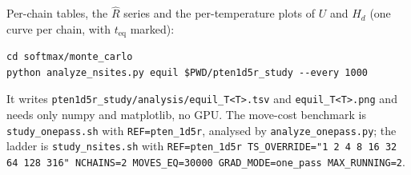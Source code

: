 \documentclass[11pt,a4paper]{article}
\newcommand{\Hd}{H_d}
\newcommand{\file}[1]{\texttt{#1}}
\begin{document}
Per-chain tables, the $\hat{R}$ series and the per-temperature plots of $U$ and
$\Hd$ (one curve per chain, with $t_{\mathrm{eq}}$ marked):
\begin{verbatim}
cd softmax/monte_carlo
python analyze_nsites.py equil $PWD/pten1d5r_study --every 1000
\end{verbatim}
It writes \file{pten1d5r\_study/analysis/equil\_T<T>.tsv} and
\file{equil\_T<T>.png} and needs only numpy and matplotlib, no GPU. The
move-cost benchmark is \file{study\_onepass.sh} with
\texttt{REF=pten\_1d5r}, analysed by \file{analyze\_onepass.py}; the ladder is
\file{study\_nsites.sh} with \texttt{REF=pten\_1d5r
TS\_OVERRIDE="1 2 4 8 16 32 64 128 316" NCHAINS=2 MOVES\_EQ=30000
GRAD\_MODE=one\_pass MAX\_RUNNING=2}.
\end{document}
